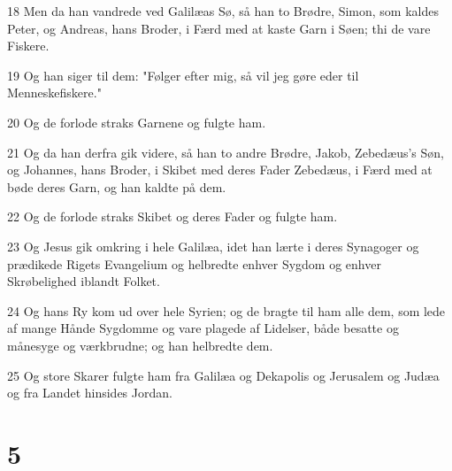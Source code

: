 \par 18 Men da han vandrede ved Galilæas Sø, så han to Brødre, Simon, som kaldes Peter, og Andreas, hans Broder, i Færd med at kaste Garn i Søen; thi de vare Fiskere.
\par 19 Og han siger til dem: "Følger efter mig, så vil jeg gøre eder til Menneskefiskere."
\par 20 Og de forlode straks Garnene og fulgte ham.
\par 21 Og da han derfra gik videre, så han to andre Brødre, Jakob, Zebedæus's Søn, og Johannes, hans Broder, i Skibet med deres Fader Zebedæus, i Færd med at bøde deres Garn, og han kaldte på dem.
\par 22 Og de forlode straks Skibet og deres Fader og fulgte ham.
\par 23 Og Jesus gik omkring i hele Galilæa, idet han lærte i deres Synagoger og prædikede Rigets Evangelium og helbredte enhver Sygdom og enhver Skrøbelighed iblandt Folket.
\par 24 Og hans Ry kom ud over hele Syrien; og de bragte til ham alle dem, som lede af mange Hånde Sygdomme og vare plagede af Lidelser, både besatte og månesyge og værkbrudne; og han helbredte dem.
\par 25 Og store Skarer fulgte ham fra Galilæa og Dekapolis og Jerusalem og Judæa og fra Landet hinsides Jordan.

\chapter{5}

